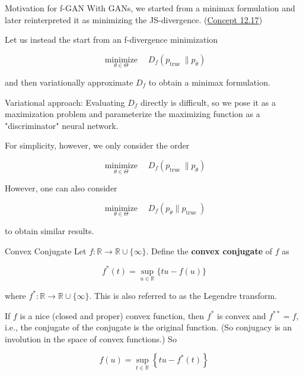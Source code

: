 \begin{frame}[allowframebreaks]

\begin{myconceptblock}{12.18}{Motivation for f-GAN}
    With GANs, we started from a minimax formulation and later reinterpreted it as minimizing the JS-divergence. (\hyperref[concept:12.17]{Concept 12.17})

    Let us instead the start from an f-divergence minimization

    $$
    \underset{\theta \in \Theta}{\operatorname{minimize}} \quad D_{f}\left(p_{\text {true }} \| p_{\theta}\right)
    $$

    and then variationally approximate $D_{f}$ to obtain a minimax formulation.

    Variational approach: Evaluating $D_{f}$ directly is difficult, so we pose it as a maximization problem and parameterize the maximizing function as a "discriminator" neural network.

    \par\noindent\textcolor{gray}{\hdashrule{\textwidth}{0.4pt}{1pt 2pt}}

    For simplicity, however, we only consider the order

    $$
    \underset{\theta \in \Theta}{\operatorname{minimize}} \quad D_{f}\left(p_{\text {true }} \| p_{\theta}\right)
    $$

    However, one can also consider

    $$
    \underset{\theta \in \Theta}{\operatorname{minimize}} \quad D_{f}\left(p_{\theta} \| p_{\text {true }}\right)
    $$

    to obtain similar results.
\end{myconceptblock}

\end{frame}

\begin{frame}[allowframebreaks]

\begin{mydefinitionblock}{12.19}{Convex Conjugate}
    Let $f: \mathbb{R} \rightarrow \mathbb{R} \cup\{\infty\}$. Define the \textbf{convex conjugate} of $f$ as

    $$
    f^{*}(t)=\sup _{u \in \mathbb{R}}\{t u-f(u)\}
    $$

    where $f^{*}: \mathbb{R} \rightarrow \mathbb{R} \cup\{\infty\}$. This is also referred to as the Legendre transform.

    If $f$ is a nice (closed and proper) convex function, then $f^{*}$ is convex and $f^{* *}=f$, i.e., the conjugate of the conjugate is the original function. (So conjugacy is an involution in the space of convex functions.) So

    $$
    f(u)=\sup _{t \in \mathbb{R}}\left\{t u-f^{*}(t)\right\}
    $$
\end{mydefinitionblock}

\end{frame}


